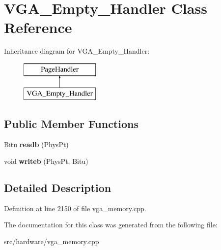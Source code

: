 \hypertarget{classVGA__Empty__Handler}{\section{V\-G\-A\-\_\-\-Empty\-\_\-\-Handler Class Reference}
\label{classVGA__Empty__Handler}
}
Inheritance diagram for V\-G\-A\-\_\-\-Empty\-\_\-\-Handler\-:\begin{figure}[H]
\begin{center}
\leavevmode
\includegraphics[height=2.000000cm]{classVGA__Empty__Handler}
\end{center}
\end{figure}
\subsection*{Public Member Functions}
\begin{DoxyCompactItemize}
\item 
\hypertarget{classVGA__Empty__Handler_ae84a276c3421d6db0f08b48d81692905}{Bitu {\bfseries readb} (Phys\-Pt)}\label{classVGA__Empty__Handler_ae84a276c3421d6db0f08b48d81692905}

\item 
\hypertarget{classVGA__Empty__Handler_a291f19e5b04518175d51cb6089424004}{void {\bfseries writeb} (Phys\-Pt, Bitu)}\label{classVGA__Empty__Handler_a291f19e5b04518175d51cb6089424004}

\end{DoxyCompactItemize}


\subsection{Detailed Description}


Definition at line 2150 of file vga\-\_\-memory.\-cpp.



The documentation for this class was generated from the following file\-:\begin{DoxyCompactItemize}
\item 
src/hardware/vga\-\_\-memory.\-cpp\end{DoxyCompactItemize}
